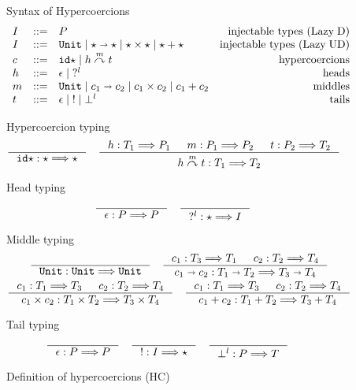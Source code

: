 \documentclass[acmsmall,review,anonymous]{acmart}\settopmatter{printfolios=true,printccs=false,printacmref=false}
\newcommand{\stxrule}[3]{#1 & ::= & #3 & \text{#2}\\}
\newcommand{\plus}[0]{+}
\newcommand{\lazyUD}{Lazy\;UD}
\newcommand{\lazyD}{Lazy\;D}
\newcommand{\TOOdyn}[0]{\star}
\newcommand{\POOunit}[0]{\mathtt{Unit}}
\newcommand{\POOfun}[2]{#1 \shortrightarrow #2}
\newcommand{\POOprod}[2]{#1 \times #2}
\newcommand{\POOsum}[2]{#1 \plus #2}
\newcommand{\typingHC}[3]{#1 : #2 \Longrightarrow #3}
\newcommand{\hyperCoercionI}[0]{\mathtt{id\star}}
\newcommand{\hyperCoercionC}[3]{#1 \overset{#2}{\curvearrowright} #3}
\begin{document}
\begin{figure}
  Syntax of Hypercoercions
  \[
  \begin{array}{lclr}
  \stxrule{I}{injectable types (\lazyD)}{P}
  \stxrule{I}{injectable types (\lazyUD)}{
    \POOunit \mid
    \POOfun{\TOOdyn}{\TOOdyn} \mid
    \POOprod{\TOOdyn}{\TOOdyn} \mid
    \POOsum{\TOOdyn}{\TOOdyn}
  }
  \stxrule{c}{hypercoercions}{
    \hyperCoercionI \mid{}
    \hyperCoercionC{h}{m}{t}
  }
  \stxrule{h}{heads}{
    \epsilon \mid{}
    ?^l
  }
  \stxrule{m}{middles}{
    \POOunit \mid
    \POOfun{c_1}{c_2} \mid
    \POOprod{c_1}{c_2} \mid
    \POOsum{c_1}{c_2}
  }
  \stxrule{t}{tails}{
    \epsilon \mid{}
    ! \mid{}
    \bot^l
  }
  \end{array}
  \]
    
  Hypercoercion typing 
  \begin{gather*}
  \inference{}{\typingHC{\hyperCoercionI}{\TOOdyn}{\TOOdyn}}
  \quad
  \inference{
    \typingHC{h}{T_1}{P_1} &
    \typingHC{m}{P_1}{P_2} &
    \typingHC{t}{P_2}{T_2}
  }{
    \typingHC{\hyperCoercionC{h}{m}{t}}{T_1}{T_2}
  }
  \end{gather*}
  
  Head typing \fbox{$\typingHC{h}{T}{P}$}
  \begin{gather*}
  \inference{}{\typingHC{\epsilon}{P}{P}}
  \quad
  \inference{}{\typingHC{?^l}{\TOOdyn}{I}}
  \end{gather*}
  
  Middle typing \fbox{$\typingHC{m}{T}{T}$}
  \begin{gather*}
  \inference{}{\typingHC{\POOunit}{\POOunit}{\POOunit}}
  \quad
  \inference{
    \typingHC{c_1}{T_3}{T_1} &
    \typingHC{c_2}{T_2}{T_4}
  }{
    \typingHC{\POOfun{c_1}{c_2}}{\POOfun{T_1}{T_2}}{\POOfun{T_3}{T_4}}
  }
  \\
  \inference{
    \typingHC{c_1}{T_1}{T_3} &
    \typingHC{c_2}{T_2}{T_4}
  }{
    \typingHC{\POOprod{c_1}{c_2}}{\POOprod{T_1}{T_2}}{\POOprod{T_3}{T_4}}
  }
  \quad
  \inference{
    \typingHC{c_1}{T_1}{T_3} &
    \typingHC{c_2}{T_2}{T_4}
  }{
    \typingHC{\POOsum{c_1}{c_2}}{\POOsum{T_1}{T_2}}{\POOsum{T_3}{T_4}}
  }
    \end{gather*}
    
    Tail typing \fbox{$\typingHC{t}{P}{T}$}
    \begin{gather*}
    \inference{}{\typingHC{\epsilon}{P}{P}} \quad
    \inference{}{\typingHC{!}{I}{\TOOdyn}} \quad
    \inference{}{\typingHC{\bot^l}{P}{T}} \quad
    \end{gather*}
  
  \caption{Definition of hypercoercions (HC)}
  \label{fig:hypercoercion}
\end{figure}
\end{document}
